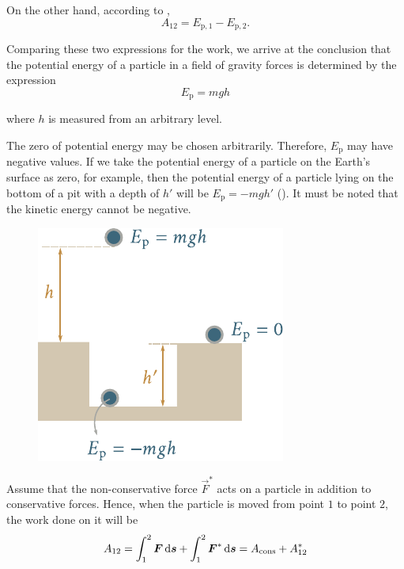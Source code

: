 \noindent
On the other hand, according to ,
\begin{equation*}
A_{12} = E_{\text{p},1} - E_{\text{p},2}.
\end{equation*}

\noindent
Comparing these two expressions for the work, we arrive at the conclusion that the potential energy of a particle in a field of gravity forces is determined by the expression
\begin{equation}\label{eq:3_36}
E_{\text{p}} = mgh
\end{equation}

\noindent
where $h$ is measured from an arbitrary level.

The zero of potential energy may be chosen arbitrarily. Therefore, $E_{\text{p}}$ may have negative values. If we take the potential energy of a particle on the Earth's surface as zero, for example, then the potential energy of a particle lying on the bottom of a pit with a depth of $h'$ will be $E_{\text{p}}=-mgh'$ (). It must be noted that the kinetic energy cannot be negative.

\begin{figure}[t]
	\begin{center}
		\includegraphics[scale=1]{figures/ch_03/fig_3_10.pdf}
		\caption[]{}
		\label{fig:3_10}
	\end{center}
	\vspace{-0.7cm}
\end{figure}

Assume that the non-conservative force $\vec{F}^*$ acts on a particle in addition to conservative forces. Hence, when the particle is moved from point $1$ to point $2$, the work done on it will be
\begin{equation*}
A_{12} = \int_{1}^{2} \boldsymbol{F}\,\mathrm{d}\boldsymbol{s} + \int_{1}^{2} \boldsymbol{F}^*\,\mathrm{d}\boldsymbol{s} = A_{\text{cons}} + A_{12}^*
\end{equation*}

